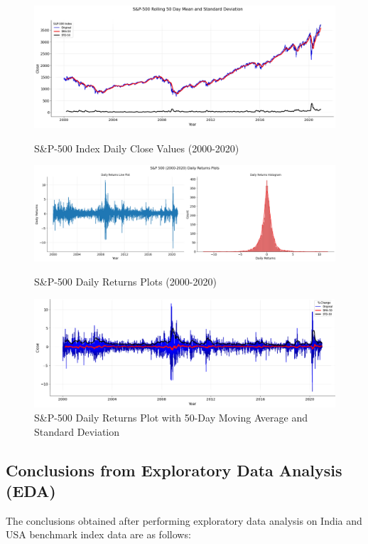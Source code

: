 \documentclass[conference]{IEEEtran}
\begin{document}
\begin{figure}[htbp]
	\centering
	\includegraphics[scale = 1.5, width = 0.52 \textwidth]{images/S&P-500 Line Plot.png}
	\vspace{-0.3in}
	\caption{S\&P-500 Index Daily Close Values (2000-2020)}
	\label{fig: s_and_p_500_index_line_plot}
	
	\vspace{0.1in}
	\includegraphics[scale = 1.5, width = 0.54 \textwidth]{images/S&P-500 Change Plot.png}
	\vspace{-0.3in}
	\caption{S\&P-500 Daily Returns Plots (2000-2020)}
	\label{fig: s_and_p_500_percentage_change_plot_1}
	
	\vspace{0.1in}
	\includegraphics[scale = 1.5, width = 0.52 \textwidth]{images/S&P-500 White Noise Part.png}
	\vspace{-0.3in}
	\caption{S\&P-500 Daily Returns Plot with 50-Day Moving Average and Standard Deviation}
	\label{fig: s_and_p_500_percentage_change_plot_2}
\end{figure}

\subsection{Conclusions from Exploratory Data Analysis (EDA)}
The conclusions obtained after performing exploratory data analysis on India and USA benchmark index data are as follows:
\end{document}

